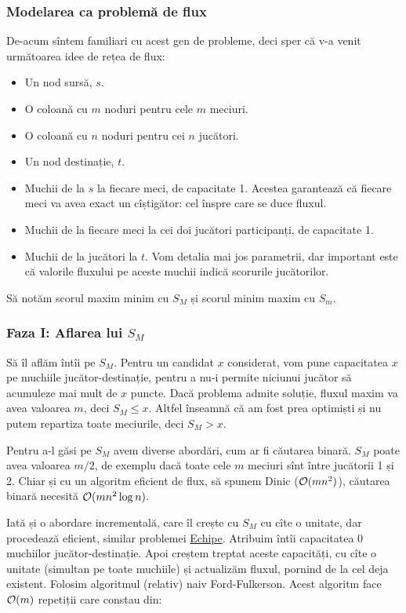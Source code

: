 \documentclass[../main.tex]{subfiles}
\begin{document}
\subsubsection*{Modelarea ca problemă de flux}

De-acum sîntem familiari cu acest gen de probleme, deci sper că v-a venit următoarea idee de rețea de flux:

\begin{itemize}
  \item Un nod sursă, $s$.
  \item O coloană cu $m$ noduri pentru cele $m$ meciuri.
  \item O coloană cu $n$ noduri pentru cei $n$ jucători.
  \item Un nod destinație, $t$.
  \item Muchii de la $s$ la fiecare meci, de capacitate 1. Acestea garantează că fiecare meci va avea exact un cîștigător: cel înspre care se duce fluxul.
  \item Muchii de la fiecare meci la cei doi jucători participanți, de capacitate 1.
  \item Muchii de la jucători la $t$. Vom detalia mai jos parametrii, dar important este că valorile fluxului pe aceste muchii indică scorurile jucătorilor.
\end{itemize}

Să notăm scorul maxim minim cu $S_M$ și scorul minim maxim cu $S_m$.

\subsubsection*{Faza I: Aflarea lui \texorpdfstring{$S_M$}{S_M}}

Să îl aflăm întîi pe $S_M$. Pentru un candidat $x$ considerat, vom pune capacitatea $x$ pe muchiile jucător-destinație, pentru a nu-i permite niciunui jucător să acumuleze mai mult de $x$ puncte. Dacă problema admite soluție, fluxul maxim va avea valoarea $m$, deci $S_M \leq x$. Altfel înseamnă că am fost prea optimiști și nu putem repartiza toate meciurile, deci $S_M > x$.

Pentru a-l găsi pe $S_M$ avem diverse abordări, cum ar fi căutarea binară. $S_M$ poate avea valoarea $m/2$, de exemplu dacă toate cele $m$ meciuri sînt între jucătorii 1 și 2. Chiar și cu un algoritm eficient de flux, să spunem Dinic ($\mathcal{O}(mn^2)$), căutarea binară necesită $\mathcal{O}(mn^2 \log n)$.

Iată și o abordare incrementală, care îl crește cu $S_M$ cu cîte o unitate, dar procedează eficient, similar problemei \hyperref[problem:echipe]{Echipe}. Atribuim întîi capacitatea 0 muchiilor jucător-destinație. Apoi creștem treptat aceste capacități, cu cîte o unitate (simultan pe toate muchiile) și actualizăm fluxul, pornind de la cel deja existent. Folosim algoritmul (relativ) naiv Ford-Fulkerson. Acest algoritm face $\mathcal{O}(m)$ repetiții care constau din:
\end{document}
